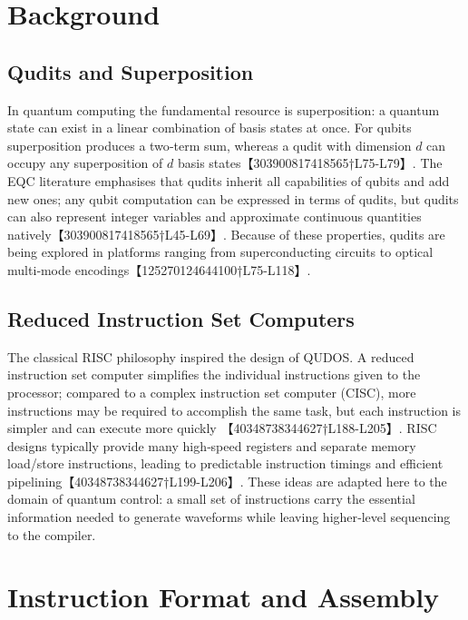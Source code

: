 \documentclass[11pt]{article}
\begin{document}
\section{Background}

\subsection{Qudits and Superposition}
In quantum computing the fundamental resource is superposition: a
quantum state can exist in a linear combination of basis states at
once.  For qubits superposition produces a two‑term sum, whereas a
qudit with dimension $d$ can occupy any superposition of $d$ basis
states【303900817418565†L75-L79】.  The EQC literature emphasises that
qudits inherit all capabilities of qubits and add new ones; any qubit
computation can be expressed in terms of qudits, but qudits can also
represent integer variables and approximate continuous quantities
natively【303900817418565†L45-L69】.  Because of these properties, qudits
are being explored in platforms ranging from superconducting circuits to
optical multi‑mode encodings【125270124644100†L75-L118】.

\subsection{Reduced Instruction Set Computers}
The classical RISC philosophy inspired the design of QUDOS.  A reduced
instruction set computer simplifies the individual instructions given
to the processor; compared to a complex instruction set computer
(CISC), more instructions may be required to accomplish the same task,
but each instruction is simpler and can execute more quickly
【40348738344627†L188-L205】.  RISC designs typically provide many high‑speed
registers and separate memory load/store instructions, leading to
predictable instruction timings and efficient pipelining【40348738344627†L199-L206】.
These ideas are adapted here to the domain of quantum control: a small
set of instructions carry the essential information needed to generate
waveforms while leaving higher‑level sequencing to the compiler.

\section{Instruction Format and Assembly}
\end{document}
